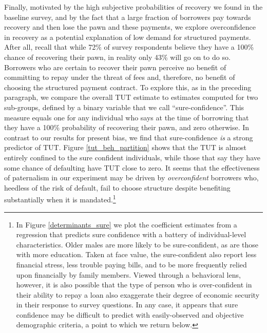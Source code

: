 \documentclass[12pt, a4paper, colorinlistoftodos]{article}
\begin{document}
Finally, motivated by the high subjective probabilities of recovery we found in the baseline survey, and by the fact that a large fraction of borrowers pay towards recovery and then lose the pawn and these payments, we explore overconfidence in recovery as a potential explanation of low demand for structured payments. After all, recall that while 72\% of survey respondents believe they have a 100\% chance of recovering their pawn, in reality only 43\% will go on to do so.  
Borrowers who are certain to recover their pawn perceive no benefit of committing to repay under the threat of fees and, therefore, no benefit of choosing the structured payment contract.
To explore this, as in the preceding paragraph, we compare the overall TUT estimate to estimates computed for two sub-groups, defined by a binary variable that we call ``sure-confidence''. This measure equals one for any individual who says at the time of borrowing that they have a 100\% probability of recovering their pawn, and zero otherwise.
In contrast to our results for present bias, we find that sure-confidence \textit{is} a strong predictor of TUT. Figure \ref{tut_beh_partition} shows that the TUT is almost entirely confined to the sure confident individuals, while those that say they have some chance of defaulting have TUT close to zero. It seems that the effectiveness of paternalism in our experiment may be driven by \emph{overconfident} borrowers who, heedless of the risk of default, fail to choose structure despite benefiting substantially when it is mandated.\footnote{In Figure \ref{determinants_sure} we plot the coefficient estimates from a regression that predicts sure confidence with a battery of individual-level characteristics.  Older males are more likely to be sure-confident, as are those with more education.  Taken at face value, the sure-confident also report less financial stress, less trouble paying bills, and to be more frequently relied upon financially by family members.  Viewed through a behavioral lens, however, it is also possible that the type of person who is over-confident in their ability to repay a loan also exaggerate their degree of economic security in their response to survey questions. In any case, it appears that sure confidence may be difficult to predict with easily-observed and objective demographic criteria, a point to which we return below.}
\end{document}
